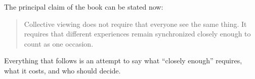 The principal claim of the book can be stated now:

\begin{quote}
Collective viewing does not require that everyone see the same thing. It requires that different experiences remain synchronized closely enough to count as one occasion.
\end{quote}

Everything that follows is an attempt to say what ``closely enough'' requires, what it costs, and who should decide.
